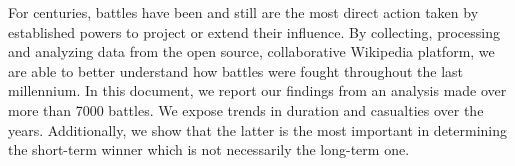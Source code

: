 For centuries, battles have been and still are the most direct action taken by established powers to project or extend their influence. By collecting, processing and analyzing data from the open source, collaborative Wikipedia platform, we are able to better understand how battles were fought throughout the last millennium. In this document, we report our findings from an analysis made over more than 7000 battles. We expose trends in duration and casualties over the years. Additionally, we show that the latter is the most important in determining the short-term winner which is not necessarily the long-term one.